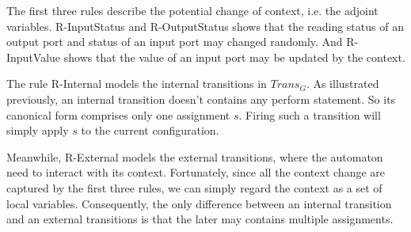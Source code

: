 The first three rules describe the potential change of context, i.e. the adjoint variables. R-InputStatus and R-OutputStatus shows that the reading status of an output port and status of an input port may changed randomly. And R-InputValue shows that the value of an input port may be updated by the context.

The rule R-Internal models the internal transitions in $Trans_G$. As illustrated previously, an internal transition doesn't contains any perform statement. So its canonical form comprises only one assignment $s$. Firing such a transition will simply apply $s$ to the current configuration.

Meanwhile, R-External models the external transitions, where the automaton need to interact with its context. Fortunately, since all the context change are captured by the first three rules, we can simply regard the context as a set of local variables. Consequently, the only difference between an internal transition and an external transitions is that the later may contains multiple assignments.